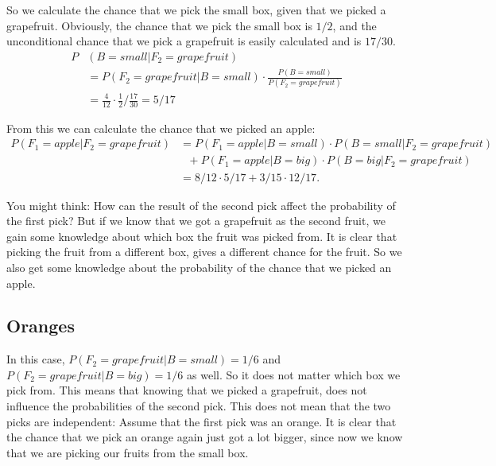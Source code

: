 \documentclass[11pt]{article}
\begin{document}
So we calculate the chance that we pick the small box, given that we picked a grapefruit. Obviously, the chance that we pick the small box is $1/2$, and the unconditional chance that we pick a grapefruit is easily calculated and is $17/30$.
\begin{align*}
P&(B=small|F_2=grapefruit)  \\
 &= P(F_2=grapefruit|B=small)\cdot\frac{P(B=small)}{P(F_2=grapefruit)}    \tag{Bayes' rule}\\
&= \frac{4}{12}\cdot \frac{1}{2}\big/\frac{17}{30} = 5/17
\end{align*}

From this we can calculate the chance that we picked an apple:
\begin{align*}
P(F_1=apple|F_2=grapefruit) &=  P(F_1=apple|B=small)\cdot P(B=small|F_2=grapefruit)\\ & \ \ \ + P(F_1=apple|B=big)\cdot P(B=big|F_2=grapefruit) \\
&=8/12\cdot 5/17 + 3/15\cdot 12/17.
\end{align*}

You might think: How can the result of the second pick affect the probability of the
first pick? But if we know that we got a grapefruit as the second fruit, we gain some knowledge about which box the fruit was picked from. It is clear that picking the fruit from a different box, gives a different chance for the fruit. So we also get some knowledge about the probability of the chance that we picked an apple.


\subsection{Oranges}
In this case, $P(F_2=grapefruit|B=small) = 1/6$ and $P(F_2=grapefruit|B=big) = 1/6$ as well. So it does not matter which box we pick from. This means that knowing that we picked a grapefruit, does not influence the probabilities of the second pick. This does not mean that the two picks are independent: Assume that the first pick was an orange. It is clear that the chance that we pick an orange again just got a lot bigger, since now we know that we are picking our fruits from the small box. 
\end{document}
